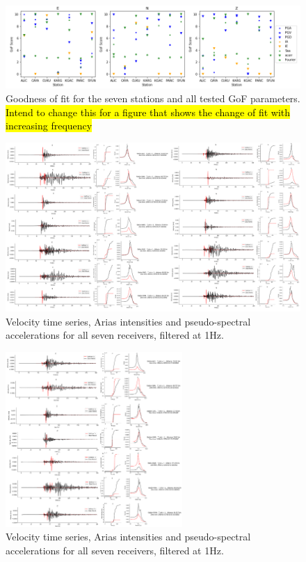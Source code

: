 \documentclass[../Text/00main.tex]{subfiles}
\begin{document}
\begin{figure}
    \centering
    \includegraphics[width=\linewidth]{images_results/Gofsevenstations.png}
    \caption{Goodness of fit for the seven stations and all tested GoF parameters. \hl{Intend to change this for a figure that shows the change of fit with increasing frequency}}
    \label{fig:GoFsevenstations}
\end{figure}



\begin{figure}
    \includegraphics[width=\textwidth]{images_results/Monsterfigure_waveforms_pt1.png}
  \caption{Velocity time series, Arias intensities and pseudo-spectral accelerations for all seven receivers, filtered at 1Hz. }
  \label{fig:monsterfigurea}
\end{figure}


\begin{figure}

    \includegraphics[width=0.6\textwidth]{images_results/monsterfigure_waveforms_pt2.png}
  \caption{Velocity time series, Arias intensities and pseudo-spectral accelerations for all seven receivers, filtered at 1Hz.}
  \label{fig:monsterfigureb}
\end{figure}
\end{document}
